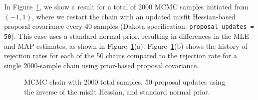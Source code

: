 In Figure~\ref{fig:rosen_restart}, we show a result for a total of
2000 MCMC samples initiated from $(-1,1)$, where we restart the chain
with an updated misfit Hessian-based proposal covariance every 40
samples (Dakota specification: \texttt{proposal\_updates = 50}).  This
case uses a standard normal prior, resulting in differences in the MLE
and MAP estimates, as shown in Figure~\ref{fig:rosen_restart}(a).
Figure~\ref{fig:rosen_restart}(b) shows the history of rejection rates
for each of the 50 chains compared to the rejection rate for a single
2000-sample chain using prior-based proposal covariance.
\begin{figure}[htbp]
  \begin{subfigmatrix}{2}
  \end{subfigmatrix}
  \caption{MCMC chain with 2000 total samples, 50 proposal updates using the inverse of the misfit Hessian, and standard normal prior.}
\label{fig:rosen_restart}
\end{figure}

